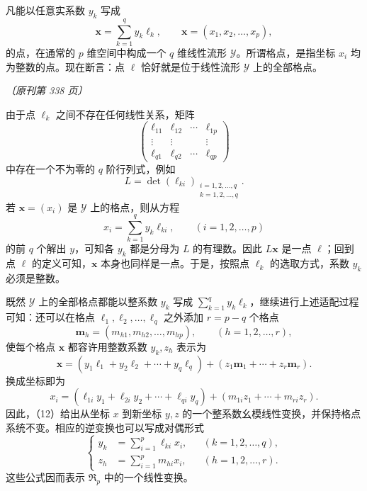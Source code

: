 \documentclass[UTF8,11pt,a4paper,fontset=none]{ctexart}
\theoremstyle{weylthm}
\newcommand{\origpage}[1]{%
  \par\vspace{0.7em}\noindent\hfill{\small\itshape〔原刊第 #1 页〕}\par\vspace{0.25em}}
\begin{document}
凡能以任意实系数 \(y_k\) 写成
\[
  \mathbf x=\sum_{k=1}^{q}y_k\boldsymbol\ell_k,
  \qquad \mathbf x=(x_1,x_2,\ldots,x_p),
\]
的点，在通常的 \(p\) 维空间中构成一个 \(q\) 维线性流形
\(\mathcal Y\)。所谓格点，是指坐标 \(x_i\) 均为整数的点。现在断言：点
\(\boldsymbol\ell\) 恰好就是位于线性流形 \(\mathcal Y\) 上的全部格点。

\origpage{338}

由于点 \(\boldsymbol\ell_k\) 之间不存在任何线性关系，矩阵
\[
\begin{pmatrix}
 \ell_{11}&\ell_{12}&\cdots&\ell_{1p}\\
 \vdots&\vdots&&\vdots\\
 \ell_{q1}&\ell_{q2}&\cdots&\ell_{qp}
\end{pmatrix}
\]
中存在一个不为零的 \(q\) 阶行列式，例如
\[
  L=\det(\ell_{ki})_{\substack{i=1,2,\ldots,q\\k=1,2,\ldots,q}}.
\]
若 \(\mathbf x=(x_i)\) 是 \(\mathcal Y\) 上的格点，则从方程
\[
  x_i=\sum_{k=1}^{q}y_k\ell_{ki},
  \qquad(i=1,2,\ldots,p)
\]
的前 \(q\) 个解出 \(y\)，可知各 \(y_k\) 都是分母为 \(L\) 的有理数。因此
\(L\mathbf x\) 是一点 \(\boldsymbol\ell\)；回到点
\(\boldsymbol\ell\) 的定义可知，\(\mathbf x\) 本身也同样是一点。于是，按照点
\(\boldsymbol\ell_k\) 的选取方式，系数 \(y_k\) 必须是整数。

既然 \(\mathcal Y\) 上的全部格点都能以整系数 \(y_k\) 写成
\(\sum_{k=1}^{q}y_k\boldsymbol\ell_k\)，继续进行上述适配过程可知：还可以在格点
\(\boldsymbol\ell_1,\boldsymbol\ell_2,\ldots,\boldsymbol\ell_q\) 之外添加
\(r=p-q\) 个格点
\[
  \mathbf m_h=(m_{h1},m_{h2},\ldots,m_{hp}),
  \qquad(h=1,2,\ldots,r),
\]
使每个格点 \(\mathbf x\) 都容许用整数系数 \(y_k,z_h\) 表示为
\begin{equation}
  \mathbf x=
  (y_1\boldsymbol\ell_1+y_2\boldsymbol\ell_2+\cdots+y_q\boldsymbol\ell_q)
  +(z_1\mathbf m_1+\cdots+z_r\mathbf m_r).
  \tag{12}
\end{equation}
换成坐标即为
\[
  x_i=(\ell_{1i}y_1+\ell_{2i}y_2+\cdots+\ell_{qi}y_q)
     +(m_{1i}z_1+\cdots+m_{ri}z_r).
\]
因此，（12）给出从坐标 \(x\) 到新坐标 \(y,z\) 的一个整系数幺模线性变换，并保持格点系统不变。相应的逆变换也可以写成对偶形式
\begin{equation}
\left\{
\begin{aligned}
 y_k&=\sum_{i=1}^{p}\ell_{ki}x_i,
 &&(k=1,2,\ldots,q),\\
 z_h&=\sum_{i=1}^{p}m_{hi}x_i,
 &&(h=1,2,\ldots,r).
\end{aligned}
\right.
\tag{13}
\end{equation}
这些公式因而表示 \(\mathfrak R_p\) 中的一个线性变换。
\end{document}
